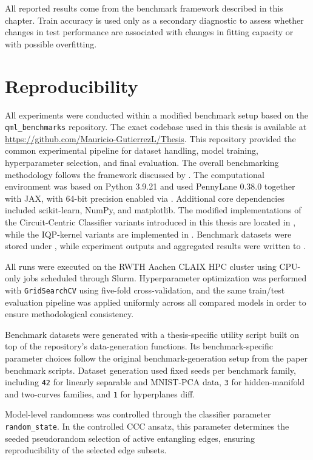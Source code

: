 \documentclass[12pt,a4paper,openany]{report}
\begin{document}
All reported results come from the benchmark framework described in this chapter. Train accuracy is used only as a secondary diagnostic to assess whether changes in test performance are associated with changes in fitting capacity or with possible overfitting.

\section{Reproducibility}
All experiments were conducted within a modified benchmark setup based on the \texttt{qml\_benchmarks} repository. The exact codebase used in this thesis is available at \url{https://github.com/Mauricio-GutierrezL/Thesis}. This repository provided the common experimental pipeline for dataset handling, model training, hyperparameter selection, and final evaluation. The overall benchmarking methodology follows the framework discussed by \citet{bowles2024better}. The computational environment was based on Python 3.9.21 and used PennyLane 0.38.0 together with JAX, with 64-bit precision enabled via . Additional core dependencies included scikit-learn, NumPy, and matplotlib. The modified implementations of the Circuit-Centric Classifier variants introduced in this thesis are located in , while the IQP-kernel variants are implemented in . Benchmark datasets were stored under , while experiment outputs and aggregated results were written to .

All runs were executed on the RWTH Aachen CLAIX HPC cluster using CPU-only jobs scheduled through Slurm. Hyperparameter optimization was performed with \texttt{GridSearchCV} using five-fold cross-validation, and the same train/test evaluation pipeline was applied uniformly across all compared models in order to ensure methodological consistency.

Benchmark datasets were generated with a thesis-specific utility script built on top of the repository's data-generation functions. Its benchmark-specific parameter choices follow the original benchmark-generation setup from the paper benchmark scripts. Dataset generation used fixed seeds per benchmark family, including \texttt{42} for linearly separable and MNIST-PCA data, \texttt{3} for hidden-manifold and two-curves families, and \texttt{1} for hyperplanes diff.

Model-level randomness was controlled through the classifier parameter \texttt{random\_state}. In the controlled CCC ansatz, this parameter determines the seeded pseudorandom selection of active entangling edges, ensuring reproducibility of the selected edge subsets.
\end{document}
